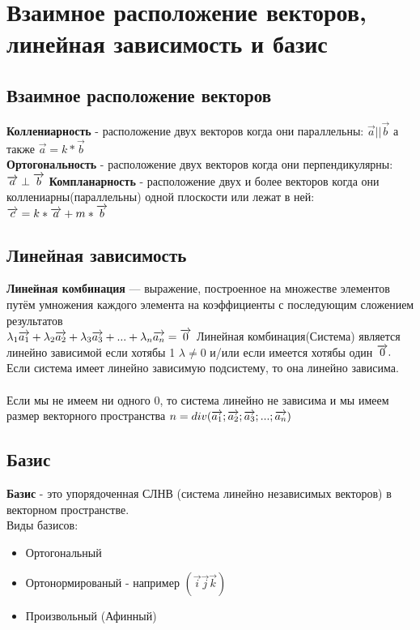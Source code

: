 \documentclass{book}
\begin{document}
\section{Взаимное расположение векторов, линейная зависимость и базис}
\subsection{Взаимное расположение векторов}
\textbf{Коллениарность} - расположение двух векторов когда они параллельны: $\overrightarrow{a}||\overrightarrow{b}$ а также $\overrightarrow{a}=k*\overrightarrow{b}$\\
\textbf{Ортогональность} - расположение двух векторов когда они перпендикулярны: $\overrightarrow{a}\perp\overrightarrow{b}\\$
\textbf{Компланарность} - расположение двух и более векторов когда они коллениарны(параллельны) одной плоскости или лежат в ней: $\overrightarrow{c}=k*\overrightarrow{a}+m*\overrightarrow{b}\\$
\subsection{Линейная зависимость}
\textbf{Линейная комбинация} — выражение, построенное на множестве элементов путём умножения каждого элемента на коэффициенты с последующим сложением результатов\\
$\lambda_1\overrightarrow{a_1}+\lambda_2\overrightarrow{a_2}+\lambda_3\overrightarrow{a_3}+...+\lambda_n\overrightarrow{a_n}=\overrightarrow{0}\\$
Линейная комбинация(Система) является линейно зависимой если хотябы 1 $\lambda\neq0$ и/или если имеется хотябы один $\overrightarrow{0}.\\$
Если система имеет линейно зависимую подсистему, то она линейно зависима.\\\\
Если мы не имеем ни одного 0, то система линейно не зависима и мы имеем размер векторного пространства $n = div(\overrightarrow{a_1};\overrightarrow{a_2};\overrightarrow{a_3};...;\overrightarrow{a_n})\\$
\subsection{Базис}
\textbf{Базис} - это упорядоченная СЛНВ (система линейно независимых векторов) в векторном пространстве.\\
Виды базисов:
\begin{itemize}
    \item Ортогональный
    \item Ортонормированый - например $(\overrightarrow{i}\overrightarrow{j}\overrightarrow{k})$
    \item Произвольный (Афинный)
\end{itemize}
\end{document}
